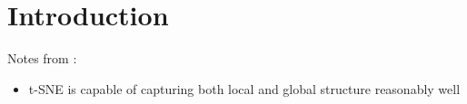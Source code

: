 \chapter{Introduction}
Notes from \cite{vdMaa08}: 
\begin{itemize}
    \item t-SNE is capable of capturing both local and global structure reasonably well 
\end{itemize}
